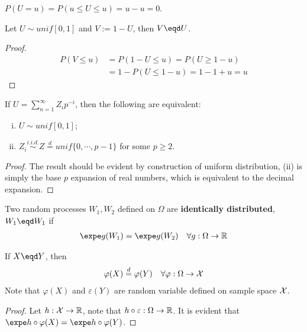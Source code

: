\documentclass{article}
\begin{document}
   	\begin{corollary}
   		$P(U = u) = P(u \leq U \leq u) = u - u = 0$.
   	\end{corollary}
   	
   	\begin{proposition}
   		Let $U \sim unif[0, 1]$ and $V:=1-U$, then $V \eqd U$.
   	\end{proposition}
   	
   	\begin{proof}
   		\begin{align}
   			P(V \leq u) &= P(1 - U \leq u) 
   			= P(U \geq 1 - u) \\
   			&= 1 - P(U \leq 1 - u)
   			= 1 - 1 + u = u
   		\end{align}
   	\end{proof}
   	
   	\begin{theorem}
   		If $U = \sum_{n=1}^\infty Z_i p^{-i}$, then the following are equivalent:
   		\begin{enumerate}[(i)]
   			\item $U \sim unif[0, 1]$;
   			\item $Z_i \overset{i.i.d.}{\sim} Z \overset{d}{=} unif\{0, \cdots, p-1\}$ for some $p \geq 2$.
   		\end{enumerate}
   	\end{theorem}
   	
   	\begin{proof}
   		The result should be evident by construction of uniform distribution, (ii) is simply the base $p$ expansion of real numbers, which is equivalent to the decimal expansion.
   	\end{proof}
   	
   	\begin{definition}
   		Two random processes $W_1, W_2$ defined on $\Omega$ are \textbf{identically distributed}, $W_1 \eqd W_1$ if 
   		\begin{align}
   			\expe g(W_1) = \expe g(W_2) \quad \forall g: \Omega \to \R
   		\end{align}
   	\end{definition}
   	
   	\begin{theorem}[Invariance I]
   		If $X \eqd Y$, then 
   		\begin{align}
   			\varphi(X) \overset{d}{=} \varphi(Y)\quad \forall \varphi: \Omega \to \mathcal{{X}}
   		\end{align}
   		Note that $\varphi(X)$ and $\varepsilon(Y)$ are random variable defined on sample space $\mathcal{{X}}$.
   	\end{theorem}
   	\begin{proof}
   		Let $h: \mathcal{{X}} \to \mathbb{R}$, note that $h \circ \varepsilon: \Omega \to \mathbb{R}$. It is evident that $\expe h \circ \varphi(X) = \expe h \circ \varphi(Y)$.
   	\end{proof}
   	
\end{document}
